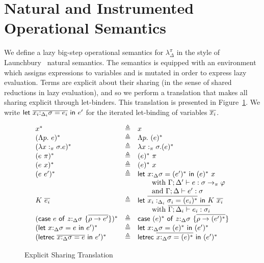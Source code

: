 \documentclass[acmsmall,review,screen]{acmart}
\newcommand{\llet}[2]{\mathsf{let}~#1~\mathsf{in}~#2}
\newcommand{\lletrec}[2]{\mathsf{letrec}~#1~\mathsf{in}~#2}
\newcommand{\ccase}[2]{\mathsf{case}~#1~\mathsf{of}~#2}
\begin{document}
\section{Natural and Instrumented Operational Semantics}\label{app:opsem}

We define a lazy big-step operational semantics for $\lambda_\Delta^\pi$ in the
style of Launchbury~\cite{10.1145/158511.158618} natural semantics. The semantics is
equipped with an environment which assigns expressions to variables and is
mutated in order to express lazy evaluation. Terms are explicit about
their sharing (in the sense of shared reductions in lazy evaluation),
and so we perform a translation that makes all sharing explicit
through let-binders. This translation is presented in Figure~\ref{fig:explicitsharing}.
We write $\llet{\ov{x_i{:}_{\Delta_i}\sigma = e_i}}{e'}$ for the iterated
let-binding of variables $\overline{x_i}$.
\begin{figure}
\[
  \begin{array}{lclr}
    x^* & \triangleq & x\\

    (\Lambda p.~e)^* & \triangleq & \Lambda p.~(e)^*\\
    (\lambda x:_\pi\sigma .e)^* & \triangleq & \lambda x:_\pi\sigma . (e)^*\\
    (e~\pi)^* & \triangleq & (e)^*~\pi\\
    (e~x)^* & \triangleq & (e)^*~x\\
    (e~e')^* & \triangleq & \llet{x{:}_{\Delta}\sigma =
                            (e')^*}{(e)^*~x}     \\ &&\qquad \mbox{with
                            $\Gamma;\Delta' \vdash e :
                            \sigma\rightarrow_\pi \varphi$} \\ &&\qquad \mbox{and
                                       $\Gamma;\Delta \vdash e' : \sigma$}\\
      K~\ov{e_i} & \triangleq & \llet{\ov{x_i:_{\Delta_i} \sigma_i =
                                   (e_i)^*}}{K~\ov{x_i}} \\ &&
                                       \qquad\mbox{with
                                       $\ov{\Gamma;\Delta_i\vdash
                                       e_i :
                                       \sigma_i}$}\\                                              
(\ccase{e}{z{:}_{\Delta}\sigma~\{\overline{\rho\to e'}\}})^* &
                                                               \triangleq
                                &
                                  \ccase{(e)^*}{z{:}_{\Delta}\sigma~\{\overline{\rho\to (e')^*}\}}\\
    (\llet{x{:}_{\Delta}\sigma = e}{e'}      )^* & \triangleq & \llet{x{:}_{\Delta}\sigma  = (e)^*}{(e')^*}    \\
    (\lletrec{\overline{x{:}_{\Delta}\sigma = e}}{e'}  )^* & \triangleq &\lletrec{\overline{x{:}_{\Delta}\sigma = (e)^*}}{(e')^*}  
      \end{array}
    \]
    \caption{Explicit Sharing Translation\label{fig:explicitsharing}}
  \end{figure}
\end{document}
